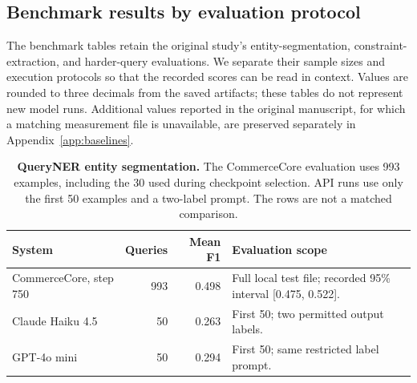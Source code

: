 \subsection{Benchmark results by evaluation protocol}
The benchmark tables retain the original study's entity-segmentation, constraint-extraction, and harder-query evaluations. We separate their sample sizes and execution protocols so that the recorded scores can be read in context. Values are rounded to three decimals from the saved artifacts; these tables do not represent new model runs. Additional values reported in the original manuscript, for which a matching measurement file is unavailable, are preserved separately in Appendix~\ref{app:baselines}.

\begin{table}[htbp]
\centering\small
\caption{\textbf{QueryNER entity segmentation.} The CommerceCore evaluation uses 993 examples, including the 30 used during checkpoint selection. API runs use only the first 50 examples and a two-label prompt. The rows are not a matched comparison.}
\label{tab:queryner-benchmark}
\begin{tabularx}{\linewidth}{@{}lrr>{\raggedright\arraybackslash}X@{}}
\toprule
System & Queries & Mean F1 & Evaluation scope \\
\midrule
CommerceCore, step 750 & 993 & 0.498 & Full local test file; recorded 95\% interval [0.475, 0.522]. \\
\midrule
Claude Haiku 4.5 & 50 & 0.263 & First 50; two permitted output labels. \\
GPT-4o mini & 50 & 0.294 & First 50; same restricted label prompt. \\
\bottomrule
\end{tabularx}
\end{table}

